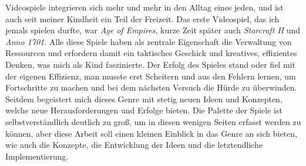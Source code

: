 Videospiele integrieren sich mehr und mehr in den Alltag eines jeden, und ist auch seit meiner Kindheit ein Teil der Freizeit. Das erste Videospiel, das ich jemals spielen durfte, war \textit{Age of Empires}, kurze Zeit später auch \textit{Starcraft II} und \textit{Anno 1701}. Alle diese Spiele haben als zentrale Eigenschaft die Verwaltung von Ressourcen und erfordern damit ein taktisches Geschick und kreatives, effizientes Denken, was mich als Kind faszinierte. Der Erfolg des Spieles stand oder fiel mit der eigenen Effizienz, man musste erst Scheitern und aus den Fehlern lernen, um Fortschritte zu machen und bei dem nächsten Versuch die Hürde zu überwinden. Seitdem begeistert mich dieses Genre mit stetig neuen Ideen und Konzepten, welche neue Herausforderungen und Erfolge bieten. Die Palette der Spiele ist selbstverständlich deutlich zu groß, um in diesen wenigen Seiten erfasst werden zu können, aber diese Arbeit soll einen kleinen Einblick in das Genre an sich bieten, wie auch die Konzepte, die Entwicklung der Ideen und die letztendliche Implementierung.
